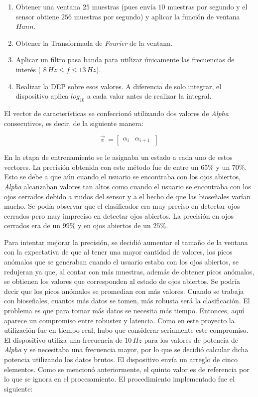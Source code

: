  \begin{enumerate}
 \item Obtener una ventana $25$ muestras (pues envía $10$ muestras por segundo y el sensor obtiene $256$ muestras por segundo) y aplicar la función de ventana $Hann$.
 \item Obtener la Transformada de \emph{Fourier} de la ventana.
 \item Aplicar un filtro pasa banda para utilizar únicamente las frecuencias de interés ( $ 8 \, Hz \leq f \leq 13 \, Hz$).
 \item Realizar la DEP sobre esos valores. A diferencia de solo integrar, el dispositivo aplica $log_{10}$  a cada valor antes de realizar la integral.
 \end{enumerate}

El vector de características se confeccionó utilizando dos valores de \emph{Alpha} consecutivos, es decir, de la siguiente manera:

\[
  \vec{v}^{\, }=
  \left[ {\begin{array}{cc}
   \alpha_{i}  & \alpha_{i + 1}  \     \end{array} } \right]
\]

En la etapa de entrenamiento se le asignaba un estado a cada uno de estos vectores. La precisión obtenida con este método fue de entre un $65\%$ y un $70\%$. Esto se debe a que aún cuando el usuario se encontraba con los ojos abiertos, \emph{Alpha} alcanzaban valores tan altos como cuando el usuario se encontraba con los ojos cerrados debido a ruidos del sensor y a el hecho de que las bioseñales varían mucho. Se podía observar que el clasificador era muy preciso en detectar ojos cerrados pero muy impreciso en detectar ojos abiertos. La precisión en ojos cerrados era de un $99\%$ y en ojos abiertos de un $25\%$.

Para intentar mejorar la precisión, se decidió aumentar el tamaño de la ventana con la expectativa de que al tener una mayor cantidad de valores, los picos anómalos que se generaban cuando el usuario estaba con los ojos abiertos, se redujeran ya que, al contar con más muestras, además de obtener picos anómalos, se obtienen los valores que corresponden al estado de ojos abiertos. Se podría decir que los picos anómalos se promedian con más valores. Cuando se trabaja con bioseñales, cuantos más datos se tomen, más robusta será la clasificación. El problema es que para tomar más datos se necesita más tiempo. Entonces, aquí aparece un compromiso entre robustez y latencia. Como en este proyecto la utilización fue en tiempo real, hubo que considerar seriamente este compromiso. El dispositivo utiliza una frecuencia de $10 \, Hz$ para los valores de potencia de \emph{Alpha} y se necesitaba una frecuencia mayor, por lo que se decidió calcular dicha potencia utilizando los datos brutos. El dispositivo envía un arreglo de cinco elementos. Como se mencionó anteriormente, el quinto valor es de referencia por lo que se ignora en el procesamiento. El procedimiento implementado fue el siguiente:

